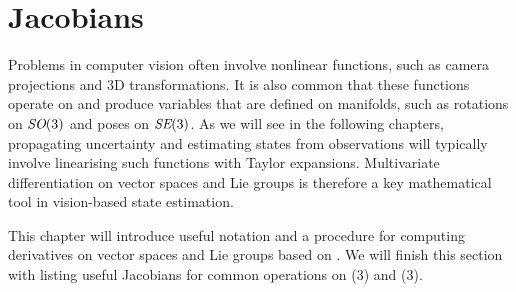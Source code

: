 \chapter{Jacobians} \label{ch:jacobians}
Problems in computer vision often involve nonlinear functions, such as camera projections and 3D transformations.
It is also common that these functions operate on and produce variables that are defined on manifolds, such as rotations on $\textit{SO}(3)$ and poses on $\textit{SE}(3)$.
As we will see in the following chapters, propagating uncertainty and estimating states from observations will typically involve linearising such functions with Taylor expansions.
Multivariate differentiation on vector spaces and Lie groups is therefore a key mathematical tool in vision-based state estimation.

This chapter will introduce useful notation and a procedure for computing derivatives on vector spaces and Lie groups based on \cite{SolaARobotics}.
We will finish this section with listing useful Jacobians for common operations on \SO(3) and \SE(3).

